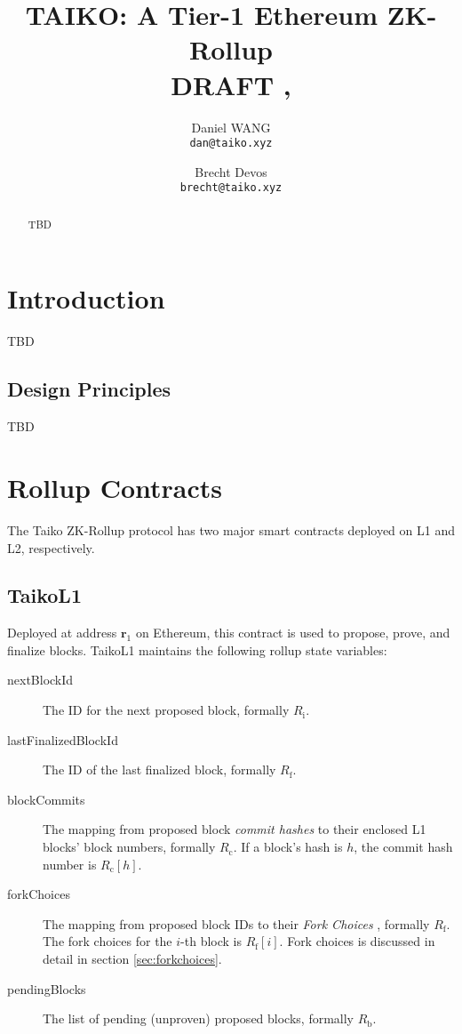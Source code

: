 \documentclass[9pt,oneside]{amsart}
\title[TAIKO: A Tier-1 Ethereum ZK-Rollup\\ \smaller \textbf{{DRAFT \VersionNumber}}]{TAIKO: A Tier-1 Ethereum ZK-Rollup \\ \smaller \textbf{{DRAFT \VersionNumber, \thedate}}}
\author{
  Daniel WANG\\
  \texttt{dan@taiko.xyz}
  \and
  Brecht Devos\\
  \texttt{brecht@taiko.xyz}
}
\begin{document}
\pagecolor{pagecolor}

\begin{abstract}
TBD
\end{abstract}

\maketitle

\setlength{\columnsep}{20pt}
\begin{multicols}{2}


\section{Introduction}

TBD

\subsection{Design Principles}

TBD

\section{Rollup Contracts}
The Taiko ZK-Rollup protocol has two major smart contracts deployed on L1 and L2, respectively.

\subsection{TaikoL1} Deployed at address $\mathbf{r_{\mathrm{1}}}$ on Ethereum, this contract is used to propose, prove, and finalize blocks. TaikoL1  maintains the following rollup state variables:

\begin{description}
\item[nextBlockId] The ID for the next proposed block, formally $R_\mathrm{i}$.
\item[lastFinalizedBlockId] The ID of the last finalized block, formally $R_\mathrm{f}$.
\item [blockCommits] The mapping from proposed block \textit{commit hashes} to their enclosed L1 blocks' block numbers, formally $R_\mathrm{c}$. If a block's hash is $h$, the commit hash number is $R_\mathrm{c}[h]$.
\item[forkChoices] The mapping from proposed block IDs to their \textit{Fork Choices} , formally $R_\mathrm{f}$. The fork choices for the $i$-th block is $R_\mathrm{f}[i]$. Fork choices is discussed in detail in section \ref{sec:forkchoices}.
\item[pendingBlocks] The list of pending (unproven) proposed blocks, formally $R_\mathrm{b}$.
\end{description}





\end{multicols}
\end{document}
